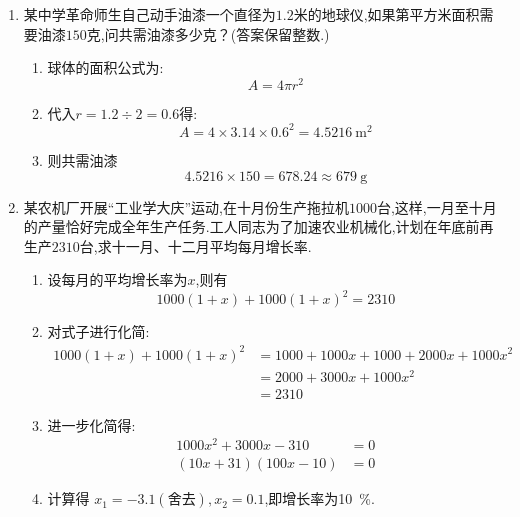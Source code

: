 \begin{questions}
\begin{enumerate}[label=(\arabic*)]
\begin{proofsolution}
		      \end{proofsolution}
		\item
		      某中学革命师生自己动手油漆一个直径为$1.2$米的地球仪,如果第平方米面积需要油漆$150$克,问共需油漆多少克？(答案保留整数.)
		      \begin{solution}
			      \begin{enumerate}[label=\protect\circled{\arabic*}]
				      \item 球体的面积公式为:
				            \begin{equation*}
					            A = 4\pi r^2
				            \end{equation*}
				      \item  代入$r=1.2\div 2 = 0.6$得:
				            \begin{equation*}
					            A = 4\times 3.14 \times 0.6^2 = \qty{4.5216}{\meter\squared}
				            \end{equation*}
				      \item 则共需油漆
				            \begin{equation*}
					            4.5216 \times 150 = 678.24 \approx \qty{679}{\gram}
				            \end{equation*}
			      \end{enumerate}

		      \end{solution}
		\item
		      某农机厂开展\enquote{工业学大庆}运动,在十月份生产拖拉机$1000$台,这样,一月至十月的产量恰好完成全年生产任务.工人同志为了加速农业机械化,计划在年底前再生产$2310$台,求十一月、十二月平均每月增长率.

		      \begin{solution}
			      \begin{enumerate}[label=\protect\circled{\arabic*}]
				      \item 设每月的平均增长率为$x$,则有
				            \begin{equation*}
					            1000(1+x) + 1000(1+x)^2 = 2310
				            \end{equation*}
				      \item	对式子进行化简:
				            \begin{align*}
					            1000(1+x) + 1000(1+x)^2 & = 1000 + 1000x + 1000 + 2000x + 1000x^2 \\
					                                    & = 2000 + 3000x + 1000x^2                \\
					                                    & = 2310
				            \end{align*}
				      \item 进一步化简得:
				            \begin{align*}
					            1000x^2 +3000x - 310  & = 0 \\
					            (10x + 31)(100x - 10) & = 0
				            \end{align*}
				      \item 计算得 $x_1=-3.1(\text{舍去}), x_2=0.1$,即增长率为\qty{10}{\percent}.
			      \end{enumerate}


\end{solution}
\end{enumerate}
\end{questions}
